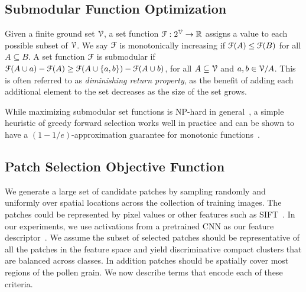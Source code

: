 \documentclass[10pt,twocolumn,letterpaper]{article}
\def\RB{{\mathbb R}}
\begin{document}
\subsection{Submodular Function Optimization}

Given a finite ground set $\cal V$, a set function ${\cal F}: 2^{\cal V}
\rightarrow \RB$ assigns a value to each possible subset of $\cal V$.
We say ${\cal F}$ is monotonically increasing if ${\cal F}(A) \le {\cal F}(B)$
for all $A \subseteq B$.  A set function ${\cal F}$ is submodular if ${\cal
F}(A\cup a) - {\cal F}(A) \ge {\cal F}(A\cup \{a, b \}) - {\cal F}(A\cup b) $,
for all $A \subseteq {\cal V}$ and $a, b \in {\cal V}/A$.
This is often referred to as {\em diminishing return property}, as the benefit
of adding each additional element to the set decreases as the size of the set
grows.

While maximizing submodular set functions is NP-hard in
general~\cite{cornuejols1983uncapacitated}, a simple heuristic of greedy
forward selection works well in practice and can be shown to have a
$(1-1/e)$-approximation guarantee for monotonic
functions~\cite{cornuejols1983uncapacitated,nemhauser1978analysis}.


\subsection{Patch Selection Objective Function}
We generate a large set of candidate patches by sampling randomly and uniformly over spatial
locations across the collection of training images.  The patches could be
represented by pixel values or other features such as
SIFT~\cite{lowe2004distinctive}.  In our experiments, we use activations from
a pretrained CNN as our feature descriptor~\cite{krizhevsky2012imagenet,simonyan2014very}.
We assume the subset of selected patches should be representative of all the
patches in the feature space and yield discriminative compact clusters that are
balanced across classes. In addition patches should be spatially cover most
regions of the pollen grain. We now describe terms that encode each of these
criteria.
\end{document}
